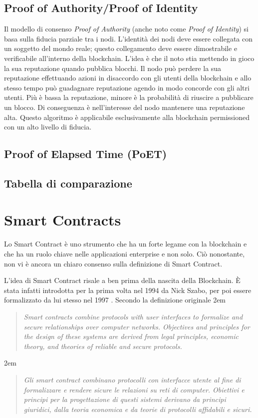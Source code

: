 \subsection{Proof of Authority/Proof of Identity}
Il modello di consenso \textit{Proof of Authority} (anche noto come \textit{Proof of Identity})
si basa sulla fiducia parziale tra i nodi.
L'identità dei nodi deve essere collegata con un soggetto del mondo reale; questo collegamento deve essere
dimostrabile e verificabile all'interno della blockchain.
L'idea è che il noto stia mettendo in gioco la sua reputazione quando pubblica blocchi. 
Il nodo può perdere la sua reputazione effettuando azioni in disaccordo con gli utenti della blockchain
e allo stesso tempo può guadagnare reputazione agendo in modo concorde con gli altri utenti.
Più è bassa la reputazione, minore è la probabilità di riuscire a pubblicare un blocco.
Di conseguenza è nell'interesse del nodo mantenere una reputazione alta. Questo algoritmo
è applicabile esclusivamente alla blockchain permissioned con un alto livello di fiducia.

\subsection{Proof of Elapsed Time (PoET)}

\subsection{Tabella di comparazione}

\section{Smart Contracts}
Lo Smart Contract è uno strumento che ha un forte legame con la blockchain e che ha un ruolo chiave
nelle applicazioni enterprise e non solo.
Ciò nonostante, non vi è ancora un chiaro consenso sulla definizione di Smart Contract.

L'idea di Smart Contract risale a ben prima della nascita della Blockchain. È stata infatti introdotta
per la prima volta nel 1994 da Nick Szabo, per poi
essere formalizzato da lui stesso nel 1997 \cite{szabo-smart-contracts}.
Secondo la definizione originale
\begingroup
\advance\leftmargini 2em
\begin{quote}
	{
		{\em Smart contracts combine protocols with user interfaces to formalize
				and secure relationships over computer networks.
				Objectives and principles for the design of these systems
				are derived from legal principles, economic theory,
				and theories of reliable and secure protocols.}
	}
\end{quote}
\endgroup
\begingroup
\advance\leftmargini 2em
\begin{quote}
	{
		{\em Gli smart contract combinano protocolli con interfacce utente
				al fine di formalizzare e rendere sicure
				le relazioni su reti di computer.
				Obiettivi e principi per la progettazione di questi sistemi
				derivano da principi giuridici, dalla teoria economica
				e da teorie di protocolli affidabili e sicuri.}
	}
\end{quote}
\endgroup

